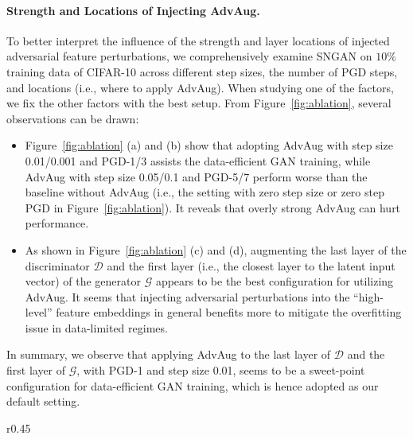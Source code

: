 \documentclass{article}
\begin{document}
\paragraph{Strength and Locations of Injecting AdvAug.} To better interpret the influence of the strength and layer locations of injected adversarial feature perturbations, we comprehensively examine SNGAN on $10\%$ training data of CIFAR-10 across different step sizes, the number of PGD steps, and locations (i.e., where to apply AdvAug). When studying one of the factors, we fix the other factors with the best setup. From Figure~\ref{fig:ablation}, several observations can be drawn:
\vspace{-1mm}
\begin{itemize}
    \item Figure~\ref{fig:ablation} (a) and (b) show that adopting AdvAug with step size 0.01/0.001 and PGD-1/3 assists the data-efficient GAN training, while AdvAug with step size 0.05/0.1 and PGD-5/7 perform worse than the baseline without AdvAug (i.e., the setting with zero step size or zero step PGD in Figure~\ref{fig:ablation}). It reveals that overly strong AdvAug can hurt performance. \vspace{-1mm}
    \item As shown in Figure~\ref{fig:ablation} (c) and (d), augmenting the last layer of the discriminator $\mathcal{D}$ and the first layer (i.e., the closest layer to the latent input vector) of the generator $\mathcal{G}$ appears to be the best configuration for utilizing AdvAug. It seems that injecting adversarial perturbations into the ``high-level'' feature embeddings in general benefits more to mitigate the overfitting issue in data-limited regimes.
\end{itemize}
\vspace{-2mm}
In summary, we observe that applying AdvAug to the last layer of $\mathcal{D}$ and the first layer of $\mathcal{G}$, with PGD-1 and step size 0.01, seems to be a sweet-point configuration for data-efficient GAN training, which is hence adopted as our default setting.

\begin{wraptable}{r}{0.45\linewidth}
\vspace{-1.8em}
\caption{\small Performance of SNGAN models augmented by Gaussian Noise or AdvAug on $100\%$ and $10\%$ training data.}
\label{tab:random_noise}
\centering
{}
\vspace{-4mm}
\end{wraptable}
\end{document}
